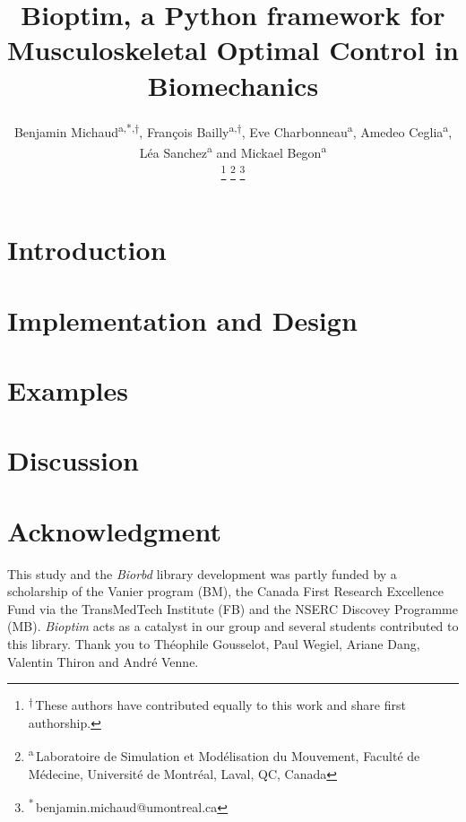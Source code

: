 \documentclass[letterpaper, 10 pt, conference]{ieeeconf}  %
\title{\LARGE \bf Bioptim, a Python framework for Musculoskeletal Optimal Control in Biomechanics}
\author{Benjamin Michaud\textsuperscript{a,*,$\dagger$}, François Bailly\textsuperscript{a,$\dagger$}, Eve Charbonneau\textsuperscript{a}, Amedeo Ceglia\textsuperscript{a}, Léa Sanchez\textsuperscript{a}  and  Mickael Begon\textsuperscript{a}%

\thanks{\textsuperscript{$\dagger$}\,These authors have contributed equally to this work and share first authorship.}
\thanks{\textsuperscript{a}\,Laboratoire de Simulation et Modélisation du Mouvement, Faculté de Médecine, Université de Montréal, Laval, QC, Canada}%
\thanks{\textsuperscript{*}\,benjamin.michaud@umontreal.ca}
}
\newcommand{\bioptim}{\textit{Bioptim}\xspace}
\newcommand{\biorbd}{\textit{Biorbd}\xspace}
\begin{document}
\maketitle
\thispagestyle{plain}
\pagestyle{plain}



\section{Introduction}\label{sec:introduction}


\section{Implementation and Design}\label{sec:design&impl}


\section{Examples}\label{sec:Examples}


\section{Discussion}\label{sec:discussion}


\section*{Acknowledgment}
This study and the \biorbd library development was partly funded by a scholarship of the  Vanier program (BM), the Canada First Research Excellence Fund via the TransMedTech Institute (FB) and the NSERC Discovey Programme (MB). 
\bioptim acts as a catalyst in our group and several students contributed to this library. 
Thank you to Théophile Gousselot, Paul Wegiel, Ariane Dang, Valentin Thiron and André Venne. 




\end{document}
